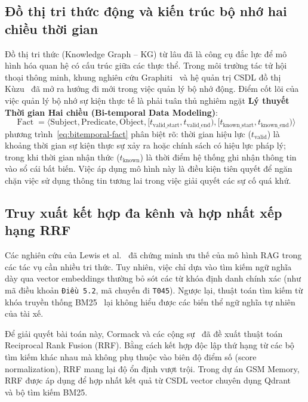 \documentclass[a4paper,11pt]{article}
\begin{document}
\subsection{Đồ thị tri thức động và kiến trúc bộ nhớ hai chiều thời gian}
Đồ thị tri thức (Knowledge Graph -- KG) từ lâu đã là công cụ đắc lực để mô hình hóa quan hệ có cấu trúc giữa các thực thể. Trong môi trường tác tử hội thoại thông minh, khung nghiên cứu Graphiti~\cite{graphiti2024} và hệ quản trị CSDL đồ thị Kùzu~\cite{kuzu2023} đã mở ra hướng đi mới trong việc quản lý bộ nhớ động. Điểm cốt lõi của việc quản lý bộ nhớ sự kiện thực tế là phải tuân thủ nghiêm ngặt \textbf{Lý thuyết Thời gian Hai chiều (Bi-temporal Data Modeling)}:
\begin{equation}
    \operatorname{Fact} = \langle \text{Subject}, \text{Predicate}, \text{Object}, [t_{\text{valid\_start}}, t_{\text{valid\_end}}), [t_{\text{known\_start}}, t_{\text{known\_end}})\rangle
    \label{eq:bitemporal-fact}
\end{equation}
phương trình~\eqref{eq:bitemporal-fact} phân biệt rõ: thời gian hiệu lực ($t_{\text{valid}}$) là khoảng thời gian sự kiện thực sự xảy ra hoặc chính sách có hiệu lực pháp lý; trong khi thời gian nhận thức ($t_{\text{known}}$) là thời điểm hệ thống ghi nhận thông tin vào sổ cái bất biến. Việc áp dụng mô hình này là điều kiện tiên quyết để ngăn chặn việc sử dụng thông tin tương lai trong việc giải quyết các sự cố quá khứ.

\subsection{Truy xuất kết hợp đa kênh và hợp nhất xếp hạng RRF}
Các nghiên cứu của Lewis et al.~\cite{lewis2020rag} đã chứng minh ưu thế của mô hình RAG trong các tác vụ cần nhiều tri thức. Tuy nhiên, việc chỉ dựa vào tìm kiếm ngữ nghĩa dày qua vector embeddings thường bỏ sót các từ khóa định danh chính xác (như mã điều khoản \texttt{Điều 5.2}, mã chuyến đi \texttt{T045}). Ngược lại, thuật toán tìm kiếm từ khóa truyền thống BM25~\cite{robertson2009bm25} lại không hiểu được các biến thể ngữ nghĩa tự nhiên của tài xế.

Để giải quyết bài toán này, Cormack và các cộng sự~\cite{cormack2009reciprocal} đã đề xuất thuật toán Reciprocal Rank Fusion (RRF). Bằng cách kết hợp độc lập thứ hạng từ các bộ tìm kiếm khác nhau mà không phụ thuộc vào biên độ điểm số (score normalization), RRF mang lại độ ổn định vượt trội. Trong dự án GSM Memory, RRF được áp dụng để hợp nhất kết quả từ CSDL vector chuyên dụng Qdrant~\cite{qdrant2023} và bộ tìm kiếm BM25.
\end{document}
